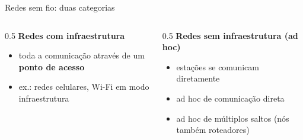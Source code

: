 \documentclass[aspectratio=169,11pt]{beamer}
\begin{document}
\begin{frame}{Redes sem fio: duas categorias}
  \begin{columns}
    \begin{column}{0.5\textwidth}
      \textbf{Redes com infraestrutura}
      \begin{itemize}
        \item toda a comunicação através de um \textbf{ponto de acesso}
        \item ex.: redes celulares, Wi-Fi em modo infraestrutura
      \end{itemize}
      \begin{center}
      \end{center}
    \end{column}
    \begin{column}{0.5\textwidth}
      \textbf{Redes sem infraestrutura (ad hoc)}
      \begin{itemize}
        \item estações se comunicam diretamente
        \item ad hoc de comunicação direta
        \item ad hoc de múltiplos saltos (nós também roteadores)
      \end{itemize}
      \begin{center}
      \end{center}
    \end{column}
  \end{columns}
\end{frame}
\end{document}
